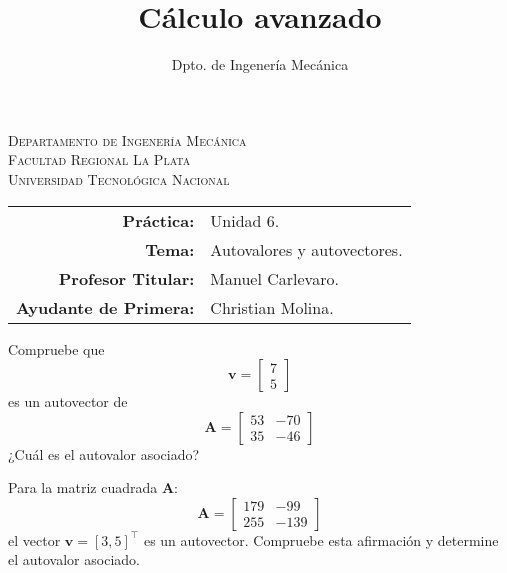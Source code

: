 \documentclass[11pt]{article}
\title{Cálculo avanzado}
\author{Dpto. de Ingenería Mecánica}
\begin{document}

\begin{center}
\end{center} 

\begin{center}
\vspace{\baselineskip}
\Large{\textsc{Departamento de Ingenería Mecánica}} \\
\textsc{Facultad Regional La Plata} \\
\textsc{Universidad Tecnológica Nacional}
\end{center}


\begin{center}
\begin{tabular}{r l}
    \textbf{Práctica:} & Unidad 6. \\
 \textbf{Tema:} & Autovalores y autovectores. \\
 \textbf{Profesor Titular:} & Manuel Carlevaro. \\
 \textbf{Ayudante de Primera:} &  Christian Molina. \\
\end{tabular}\end{center}

\vspace{1em}
\begin{question}
Compruebe que 
\[ \bm{v} = \begin{bmatrix} 7 \\ 5 \end{bmatrix} \]
es un autovector de 
\[ \bm{A} = 
    \begin{bmatrix}
        53 & -70 \\
        35 & -46
    \end{bmatrix} \]
    ¿Cuál es el autovalor asociado?
\end{question}

\begin{question} %

Para la matriz cuadrada $\bm{A}$:
    \[ \bm{A} = \begin{bmatrix} 179 & -99 \\
                255 & -139 \end{bmatrix} \]
el vector $\bm{v} = [3, 5]^{\intercal}$ es un autovector. Compruebe esta afirmación y determine el autovalor asociado.
\end{question}
\end{document}
